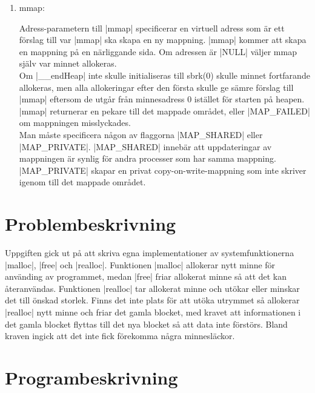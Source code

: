 \documentclass[paper=a4, fontsize=11pt]{scrartcl} %
\numberwithin{equation}{section} %
\numberwithin{figure}{section} %
\numberwithin{table}{section} %
\begin{document}
\begin{enumerate}[1)]
\item{mmap:}

Adress-parametern till |mmap| specificerar en virtuell adress som är ett
förslag till var |mmap| ska skapa en ny mappning.
|mmap| kommer att skapa en mappning på en närliggande sida.
Om adressen är |NULL| väljer mmap själv var minnet allokeras.\\

Om |__endHeap| inte skulle initialiseras till sbrk(0) skulle minnet fortfarande
allokeras, men alla allokeringar efter den första skulle ge sämre förslag till
|mmap| eftersom de utgår från minnesadress 0 istället för starten på heapen.\\

|mmap| returnerar en pekare till det mappade området, eller |MAP_FAILED| om
mappningen misslyckades.\\

Man måste specificera någon av flaggorna |MAP_SHARED| eller |MAP_PRIVATE|.
|MAP_SHARED| innebär att uppdateringar av mappningen är synlig för andra
processer som har samma mappning.
|MAP_PRIVATE| skapar en privat copy-on-write-mappning som inte skriver igenom
till det mappade området.
\end{enumerate}

\section{Problembeskrivning}
Uppgiften gick ut på att skriva egna implementationer av systemfunktionerna
|malloc|, |free| och |realloc|.
Funktionen |malloc| allokerar nytt minne för använding av programmet, medan
|free| friar allokerat minne så att det kan återanvändas.
Funktionen |realloc| tar allokerat minne och utökar eller minskar det till
önskad storlek.
Finns det inte plats för att utöka utrymmet så allokerar |realloc| nytt minne
och friar det gamla blocket, med kravet att informationen i det gamla blocket
flyttas till det nya blocket så att data inte förstörs.
Bland kraven ingick att det inte fick förekomma några minnesläckor.



\section{Programbeskrivning}
\end{document}
